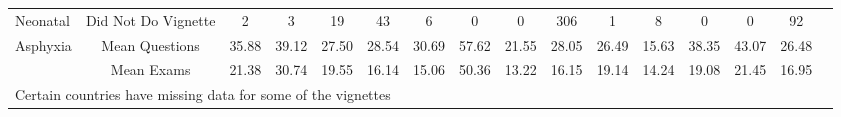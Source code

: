 \begin{tabular}{l*{15}{c}}
Neonatal&                      {Did Not Do Vignette}&          {2}&       {3}&   {19}&   {43}&       {6}&       {0}&            {0}&            {306}&       {1}&       {8}&       {0}&            {0}&            {92}\\
Asphyxia&                          {Mean Questions}&                   {35.88}&       {39.12}&   {27.50}&   {28.54}&       {30.69}&       {57.62}&       {21.55}&       {28.05}&       {26.49}&       {15.63}&      {38.35}&      {43.07}&      {26.48}\\
 &                                     {Mean Exams}&                           {21.38}&       {30.74}&   {19.55}&   {16.14}&       {15.06}&       {50.36}&       {13.22}&       {16.15}&       {19.14}&       {14.24}&      {19.08}&      {21.45}&      {16.95}\\
\hline\hline
\multicolumn{15}{l}{\footnotesize Certain countries have missing data for some of the vignettes}\\
\end{tabular}